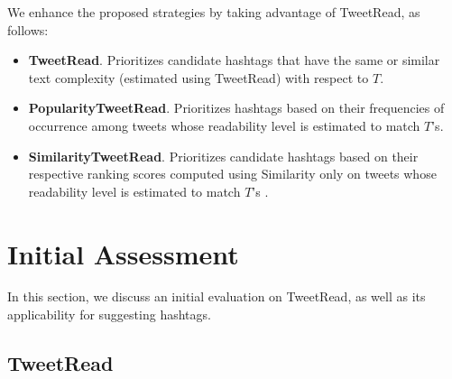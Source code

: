 \documentclass{sig-alternate-05-2015}
\begin{document}
We enhance the proposed strategies by taking advantage of TweetRead, as follows:
\begin{itemize}
\item \textbf{TweetRead}. Prioritizes candidate hashtags that have the same or similar text complexity (estimated using TweetRead) with respect to $T$.
\item \textbf{PopularityTweetRead}. Prioritizes hashtags based on their frequencies of occurrence among tweets whose readability level is estimated to match $T$'s.
\item \textbf{SimilarityTweetRead}. Prioritizes candidate hashtags based on their respective ranking scores computed using Similarity only on tweets whose readability level is estimated to match $T$'s . 
\end{itemize}
\begin{table}[]
\centering
{}
\caption{Comparison of hash-tag recommendation strategies}
\label{tab:mrr}
\end{table}
\section{Initial Assessment}
In this section, we discuss an initial evaluation on TweetRead, as well as its applicability for suggesting hashtags.

\subsection{TweetRead}
\end{document}

